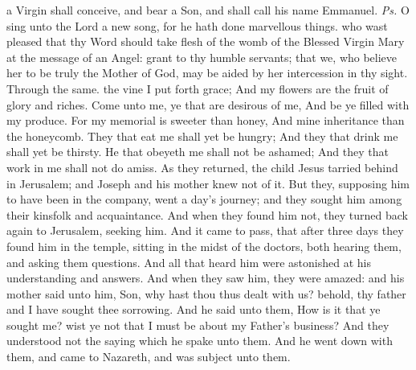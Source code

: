 \introit
{} a Virgin shall conceive, and bear a Son, and shall call his name Emmanuel. \textit{Ps.} O sing unto the Lord a new song, for he hath done marvellous things.
\collect
{} who wast pleased that thy Word should take flesh of the womb of the Blessed Virgin Mary at the message of an Angel: grant to thy humble servants; that we, who believe her to be truly the Mother of God, may be aided by her intercession in thy sight. Through the same.
 the vine I put forth grace; And my flowers are the fruit of glory and riches. Come unto me, ye that are desirous of me, And be ye filled with my produce. For my memorial is sweeter than honey, And mine inheritance than the honeycomb. They that eat me shall yet be hungry; And they that drink me shall yet be thirsty. He that obeyeth me shall not be ashamed; And they that work in me shall not do amiss. 
 As they returned, the child Jesus tarried behind in Jerusalem; and Joseph and his mother knew not of it. But they, supposing him to have been in the company, went a day's journey; and they sought him among their kinsfolk and acquaintance. And when they found him not, they turned back again to Jerusalem, seeking him. And it came to pass, that after three days they found him in the temple, sitting in the midst of the doctors, both hearing them, and asking them questions. And all that heard him were astonished at his understanding and answers. And when they saw him, they were amazed: and his mother said unto him, Son, why hast thou thus dealt with us? behold, thy father and I have sought thee sorrowing. And he said unto them, How is it that ye sought me? wist ye not that I must be about my Father's business? And they understood not the saying which he spake unto them. And he went down with them, and came to Nazareth, and was subject unto them.
